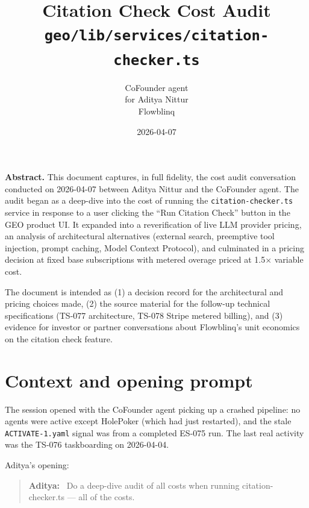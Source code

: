 \documentclass[11pt,letterpaper]{article}
\title{\color{brand}\Huge Citation Check Cost Audit\\[0.4em]
  \Large \texttt{geo/lib/services/citation-checker.ts}}
\author{CoFounder agent\\for Aditya Nittur\\Flowblinq}
\date{2026-04-07}
\newenvironment{userturn}
  {\begin{quote}\small\color{brand}\textbf{Aditya:}~}
  {\end{quote}}
\begin{document}
\maketitle

\begin{center}
\begin{minipage}{0.85\textwidth}
\small
\noindent\textbf{Abstract.} This document captures, in full fidelity, the
cost audit conversation conducted on 2026-04-07 between Aditya Nittur and the
CoFounder agent. The audit began as a deep-dive into the cost of running the
\texttt{citation-checker.ts} service in response to a user clicking the
``Run Citation Check'' button in the GEO product UI. It expanded into a
reverification of live LLM provider pricing, an analysis of architectural
alternatives (external search, preemptive tool injection, prompt caching,
Model Context Protocol), and culminated in a pricing decision at fixed base
subscriptions with metered overage priced at 1.5$\times$ variable cost.

\noindent The document is intended as (1) a decision record for the
architectural and pricing choices made, (2) the source material for the
follow-up technical specifications (TS-077 architecture, TS-078 Stripe
metered billing), and (3) evidence for investor or partner conversations
about Flowblinq's unit economics on the citation check feature.
\end{minipage}
\end{center}

\vspace{1em}

\tableofcontents

\newpage


\section{Context and opening prompt}

The session opened with the CoFounder agent picking up a crashed pipeline:
no agents were active except HolePoker (which had just restarted), and the
stale \texttt{ACTIVATE-1.yaml} signal was from a completed ES-075 run. The
last real activity was the TS-076 taskboarding on 2026-04-04.

Aditya's opening:

\begin{userturn}
Do a deep-dive audit of all costs when running citation-checker.ts --- all
of the costs.
\end{userturn}
\end{document}
